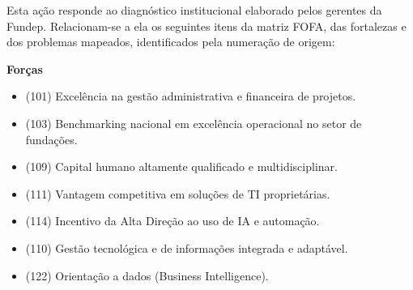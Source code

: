 \documentclass[12pt,a4paper]{article}
\begin{document}
Esta ação responde ao diagnóstico institucional elaborado pelos gerentes da Fundep. Relacionam-se a ela os seguintes itens da matriz FOFA, das fortalezas e dos problemas mapeados, identificados pela numeração de origem:

\textbf{Forças}
\begin{itemize}[leftmargin=1.27cm,topsep=0pt,itemsep=2pt,parsep=0pt]
  \item (101) Excelência na gestão administrativa e financeira de projetos.
  \item (103) Benchmarking nacional em excelência operacional no setor de fundações.
  \item (109) Capital humano altamente qualificado e multidisciplinar.
  \item (111) Vantagem competitiva em soluções de TI proprietárias.
  \item (114) Incentivo da Alta Direção ao uso de IA e automação.
  \item (110) Gestão tecnológica e de informações integrada e adaptável.
  \item (122) Orientação a dados (Business Intelligence).
\end{itemize}
\end{document}

